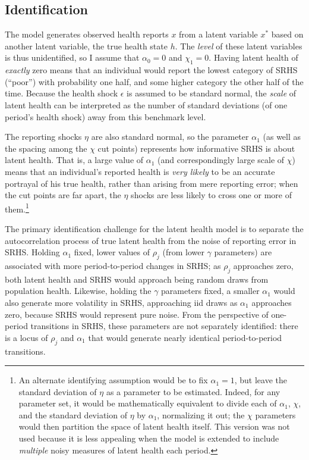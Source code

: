 \documentclass[12pt,pdftex,letterpaper]{article}
\newcommand{\Health}{h}
\newcommand{\Report}{x}
\newcommand{\Age}{j}
\newcommand{\Corr}{\rho}
\newcommand{\Cut}{\chi}
\newcommand{\CorrParam}{\gamma}
\newcommand{\LatentParam}{\alpha}
\newcommand{\HealthShock}{\epsilon}
\newcommand{\ReportShock}{\eta}
\begin{document}
\subsection{Identification}\label{sec:Identification}

The model generates observed health reports $\Report$ from a latent variable $\Report^*$ based on another latent variable, the true health state $\Health$.  The \textit{level} of these latent variables is thus unidentified, so I assume that $\LatentParam_0=0$ and $\Cut_1=0$.  Having latent health of \textit{exactly} zero means that an individual would report the lowest category of SRHS (``poor'') with probability one half, and some higher category the other half of the time.  Because the health shock $\HealthShock$ is assumed to be standard normal, the \textit{scale} of latent health can be interpreted as the number of standard deviations (of one period's health shock) away from this benchmark level.

The reporting shocks $\ReportShock$ are also standard normal, so the parameter $\LatentParam_1$ (as well as the spacing among the $\Cut$ cut points) represents how informative SRHS is about latent health.  That is, a large value of $\LatentParam_1$ (and correspondingly large scale of $\Cut$) means that an individual's reported health is \textit{very likely} to be an accurate portrayal of his true health, rather than arising from mere reporting error; when the cut points are far apart, the $\ReportShock$ shocks are less likely to cross one or more of them.\footnote{An alternate identifying assumption would be to fix $\LatentParam_1=1$, but leave the standard deviation of $\ReportShock$ as a parameter to be estimated.  Indeed, for any parameter set, it would be mathematically equivalent to divide each of $\alpha_1$, $\Cut$, and the standard deviation of $\ReportShock$ by $\LatentParam_1$, normalizing it out; the $\Cut$ parameters would then partition the space of latent health itself.  This version was not used because it is less appealing when the model is extended to include \textit{multiple} noisy measures of latent health each period.}

The primary identification challenge for the latent health model is to separate the autocorrelation process of true latent health from the noise of reporting error in SRHS.  Holding $\LatentParam_1$ fixed, lower values of $\Corr_\Age$ (from lower $\CorrParam$ parameters) are associated with more period-to-period changes in SRHS; as $\Corr_\Age$ approaches zero, both latent health and SRHS would approach being random draws from population health.  Likewise, holding the $\CorrParam$ parameters fixed, a smaller $\LatentParam_1$ would also generate more volatility in SRHS, approaching iid draws as $\LatentParam_1$ approaches zero, because SRHS would represent pure noise.  From the perspective of one-period transitions in SRHS, these parameters are not separately identified: there is a locus of $\Corr_\Age$ and $\LatentParam_1$ that would generate nearly identical period-to-period transitions.
\end{document}
